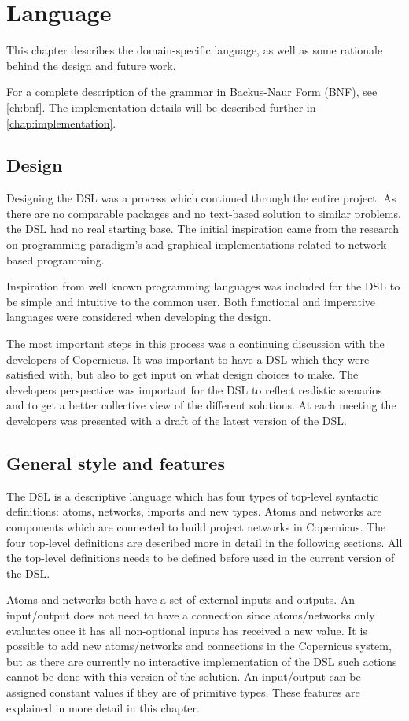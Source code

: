 \chapter{Language}\label{chap:language}
This chapter describes the domain-specific language, as well as some
rationale behind the design and future work.

For a complete description of the grammar in Backus-Naur Form (BNF),
see \autoref{ch:bnf}. The implementation details will be described
further in \autoref{chap:implementation}.


\section{Design}
Designing the DSL was a process which continued through the entire
project. As there are no comparable packages and no text-based
solution to similar problems, the DSL had no real starting base. The
initial inspiration came from the research on programming paradigm's
and graphical implementations related to network based programming.

Inspiration from well known programming languages was included for the
DSL to be simple and intuitive to the common user. Both functional and
imperative languages were considered when developing the design.

The most important steps in this process was a continuing discussion
with the developers of Copernicus. It was important to have a DSL
which they were satisfied with, but also to get input on what design
choices to make. The developers perspective was important for the DSL
to reflect realistic scenarios and to get a better collective view of
the different solutions. At each meeting the developers was presented
with a draft of the latest version of the DSL.


\section{General style and features}
The DSL is a descriptive language which has four types of top-level
syntactic definitions: atoms, networks, imports and new types. Atoms
and networks are components which are connected to build project
networks in Copernicus. The four top-level definitions are described
more in detail in the following sections. All the top-level
definitions needs to be defined before used in the current version of
the DSL.

Atoms and networks both have a set of external inputs and outputs. An
input/output does not need to have a connection since atoms/networks
only evaluates once it has all non-optional inputs has received a new
value. It is possible to add new atoms/networks and connections in the
Copernicus system, but as there are currently no interactive
implementation of the DSL such actions cannot be done with this
version of the solution. An input/output can be assigned constant
values if they are of primitive types. These features are explained in
more detail in this chapter.


